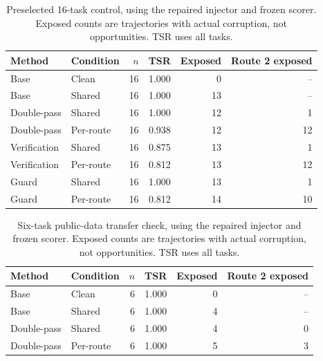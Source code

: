 \begin{table}[t]
\centering\small
\begin{tabular}{@{}llrrrr@{}}
\toprule
Method & Condition & $n$ & TSR & Exposed & Route 2 exposed \\
\midrule
Base & Clean & 16 & 1.000 & 0 & -- \\
Base & Shared & 16 & 1.000 & 13 & -- \\
Double-pass & Shared & 16 & 1.000 & 12 & 1 \\
Double-pass & Per-route & 16 & 0.938 & 12 & 12 \\
Verification & Shared & 16 & 0.875 & 13 & 1 \\
Verification & Per-route & 16 & 0.812 & 13 & 12 \\
Guard & Shared & 16 & 1.000 & 13 & 1 \\
Guard & Per-route & 16 & 0.812 & 14 & 10 \\
\bottomrule
\end{tabular}
\caption{Preselected 16-task control, using the repaired injector and frozen scorer. Exposed counts are trajectories with actual corruption, not opportunities. TSR uses all tasks.}
\label{tab:fresh-control-v3}
\end{table}
\begin{table}[t]
\centering\small
\begin{tabular}{@{}llrrrr@{}}
\toprule
Method & Condition & $n$ & TSR & Exposed & Route 2 exposed \\
\midrule
Base & Clean & 6 & 1.000 & 0 & -- \\
Base & Shared & 6 & 1.000 & 4 & -- \\
Double-pass & Shared & 6 & 1.000 & 4 & 0 \\
Double-pass & Per-route & 6 & 1.000 & 5 & 3 \\
\bottomrule
\end{tabular}
\caption{Six-task public-data transfer check, using the repaired injector and frozen scorer. Exposed counts are trajectories with actual corruption, not opportunities. TSR uses all tasks.}
\label{tab:fresh-public-v3}
\end{table}

